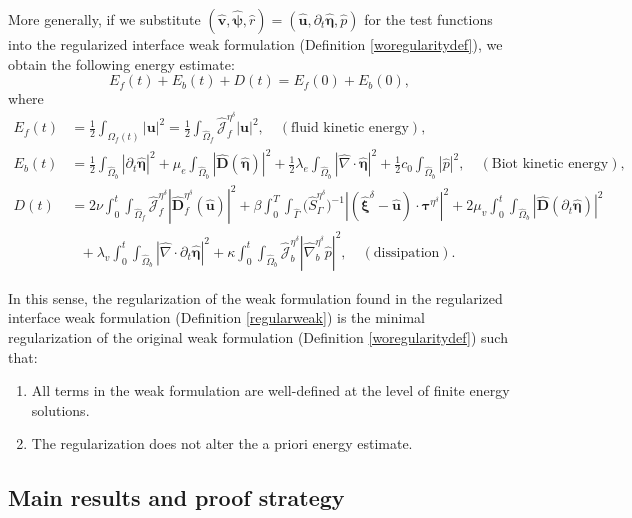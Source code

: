 \documentclass[11pt]{article}
\newcommand{\bd}{\boldsymbol}
\theoremstyle{definition}
\begin{document}
More generally, if we substitute $(\hat{\bd{v}}, \hat{\bd{\psi}}, \hat{r}) = (\hat{\bd{u}}, \partial_{t} \hat{\bd{\eta}}, \hat{p})$ for the test functions into the regularized interface weak formulation (Definition \ref{woregularitydef}), we obtain the following energy estimate:
\begin{equation}\label{energyest}
E_{f}(t) + E_{b}(t) + D(t) = E_{f}(0) + E_{b}(0),
\end{equation}
where 
\begin{align*}
E_{f}(t) &= \frac{1}{2} \int_{\Omega_{f}(t)} |\bd{u}|^{2} = \frac{1}{2} \int_{\hat{\Omega}_{f}} \hat{\mathcal{J}}^{\eta^{\delta}}_{f} |\bd{u}|^{2}, \quad (\text{fluid kinetic energy}), \\
E_{b}(t) &= \frac{1}{2} \int_{\hat{\Omega}_{b}} |\partial_{t}\hat{\bd{\eta}}|^{2} + \mu_{e} \int_{\hat{\Omega}_{b}} |\hat{\bd{D}}(\hat{\bd{\eta}})|^{2} + \frac{1}{2}\lambda_{e} \int_{\hat{\Omega}_{b}} |\hat{\nabla} \cdot \hat{\bd{\eta}}|^{2} + \frac{1}{2} c_{0} \int_{\hat{\Omega}_{b}} |\hat{p}|^{2}, \quad (\text{Biot kinetic energy}), \\
D(t) &= 2\nu \int_{0}^{t} \int_{\hat{\Omega}_{f}} \hat{\mathcal{J}}^{\eta^{\delta}}_{f} |\hat{\bd{D}}^{\eta^{\delta}}_{f}(\hat{\bd{u}})|^{2} + \beta \int_{0}^{T} \int_{\hat{\Gamma}} \Big(\hat{S}^{\eta^{\delta}}_{\Gamma}\Big)^{-1} |(\hat{\bd{\xi}}^{\delta} - \hat{\bd{u}}) \cdot \bd{\tau}^{\eta^{\delta}}|^{2} + 2\mu_{v} \int_{0}^{t} \int_{\hat{\Omega}_{b}} |\hat{\bd{D}}(\partial_{t} \hat{\bd{\eta}})|^{2} \\
&\ \ \ + \lambda_{v} \int_{0}^{t} \int_{\hat{\Omega}_{b}} |\hat{\nabla} \cdot \partial_{t}\hat{\bd{\eta}}|^{2} + \kappa \int_{0}^{t} \int_{\hat{\Omega}_{b}} \hat{\mathcal{J}}^{\eta^{\delta}}_{b} |\hat{\nabla}^{\eta^{\delta}}_{b} \hat{p}|^{2}, \quad (\text{dissipation}).
\end{align*}

In this sense, the regularization of the weak formulation found in the regularized interface weak formulation (Definition \ref{regularweak}) is the minimal regularization of the original weak formulation (Definition \ref{woregularitydef}) such that:
\begin{enumerate}
\item All terms in the weak formulation are well-defined at the level of finite energy solutions.
\item The regularization does not alter the a priori energy estimate.
\end{enumerate}

\subsection{Main results and proof strategy}
\end{document}

